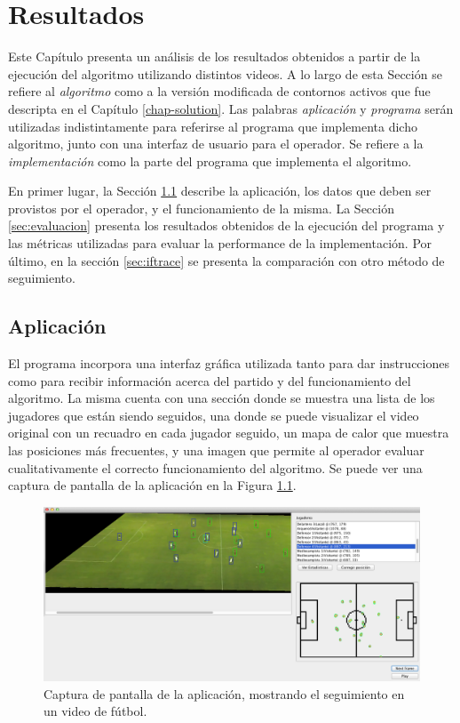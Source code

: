 \chapter{Resultados}
\label{chap-results}

Este Capítulo presenta un análisis de los resultados obtenidos a partir de la
ejecución del algoritmo utilizando distintos videos. A lo largo de esta Sección
se refiere al \textit{algoritmo} como a la versión modificada de contornos
activos que fue descripta en el Capítulo \ref{chap-solution}. Las palabras
\textit{aplicación} y \textit{programa} serán utilizadas indistintamente para
referirse al programa que implementa dicho algoritmo, junto con una interfaz de
usuario para el operador. Se refiere a la \textit{implementación} como la parte
del programa que implementa el algoritmo.

En primer lugar, la Sección \ref{sec:aplicacion} describe la aplicación, los
datos que deben ser provistos por el operador, y el funcionamiento de la misma.
La Sección \ref{sec:evaluacion} presenta los resultados obtenidos de la
ejecución del programa y las métricas utilizadas para evaluar la performance de
la implementación. Por último, en la sección \ref{sec:iftrace} se presenta la
comparación con otro método de seguimiento.

\section{Aplicación}
\label{sec:aplicacion}

El programa incorpora una interfaz gráfica utilizada tanto para dar
instrucciones como para recibir información acerca del partido y del
funcionamiento del algoritmo. La misma cuenta con una sección donde se muestra
una lista de los jugadores que están siendo seguidos, una donde se puede
visualizar el video original con un recuadro en cada jugador seguido, un mapa de
calor que muestra las posiciones más frecuentes, y una imagen que permite al
operador evaluar cualitativamente el correcto funcionamiento del algoritmo. Se
puede ver una captura de pantalla de la aplicación en la Figura
\ref{fig:screen1}.

\begin{figure}
    \centering
    \captionsetup{justification=centering}
    \includegraphics[width=\linewidth]{./images/Screen-Boca.png}
    \captionsetup{justification=centering}
    \caption{Captura de pantalla de la aplicación, mostrando el seguimiento en un video de fútbol.}
    \label{fig:screen1}
\end{figure}

